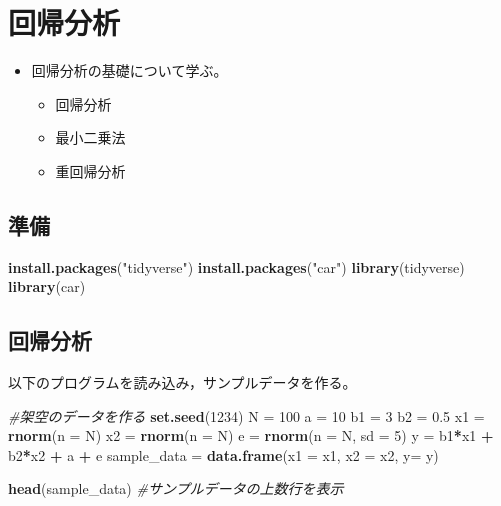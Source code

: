 \documentclass[]{article}
\newenvironment{Shaded}{\begin{snugshade}}{\end{snugshade}}
\newcommand{\KeywordTok}[1]{\textcolor[rgb]{0.13,0.29,0.53}{\textbf{#1}}}
\newcommand{\DataTypeTok}[1]{\textcolor[rgb]{0.13,0.29,0.53}{#1}}
\newcommand{\DecValTok}[1]{\textcolor[rgb]{0.00,0.00,0.81}{#1}}
\newcommand{\FloatTok}[1]{\textcolor[rgb]{0.00,0.00,0.81}{#1}}
\newcommand{\StringTok}[1]{\textcolor[rgb]{0.31,0.60,0.02}{#1}}
\newcommand{\CommentTok}[1]{\textcolor[rgb]{0.56,0.35,0.01}{\textit{#1}}}
\newcommand{\OperatorTok}[1]{\textcolor[rgb]{0.81,0.36,0.00}{\textbf{#1}}}
\newcommand{\NormalTok}[1]{#1}
\providecommand{\tightlist}{%
  \setlength{\itemsep}{0pt}\setlength{\parskip}{0pt}}
\begin{document}
\section{回帰分析}

\begin{itemize}
\tightlist
\item
  回帰分析の基礎について学ぶ。

  \begin{itemize}
  \tightlist
  \item
    回帰分析
  \item
    最小二乗法
  \item
    重回帰分析
  \end{itemize}
\end{itemize}

\subsection{準備}\label{-5}

\begin{Shaded}
\begin{Highlighting}[]
\KeywordTok{install.packages}\NormalTok{(}\StringTok{"tidyverse"}\NormalTok{)}
\KeywordTok{install.packages}\NormalTok{(}\StringTok{"car"}\NormalTok{)}
\KeywordTok{library}\NormalTok{(tidyverse)}
\KeywordTok{library}\NormalTok{(car)}
\end{Highlighting}
\end{Shaded}

\subsection{回帰分析}\label{-1}

以下のプログラムを読み込み，サンプルデータを作る。

\begin{Shaded}
\begin{Highlighting}[]
\CommentTok{#架空のデータを作る}
\KeywordTok{set.seed}\NormalTok{(}\DecValTok{1234}\NormalTok{)}
\NormalTok{N =}\StringTok{ }\DecValTok{100}
\NormalTok{a =}\StringTok{ }\DecValTok{10}
\NormalTok{b1 =}\StringTok{ }\DecValTok{3}
\NormalTok{b2 =}\StringTok{ }\FloatTok{0.5}
\NormalTok{x1 =}\StringTok{ }\KeywordTok{rnorm}\NormalTok{(}\DataTypeTok{n =}\NormalTok{ N)}
\NormalTok{x2 =}\StringTok{ }\KeywordTok{rnorm}\NormalTok{(}\DataTypeTok{n =}\NormalTok{ N)}
\NormalTok{e =}\StringTok{ }\KeywordTok{rnorm}\NormalTok{(}\DataTypeTok{n =}\NormalTok{ N, }\DataTypeTok{sd =} \DecValTok{5}\NormalTok{)}
\NormalTok{y =}\StringTok{ }\NormalTok{b1}\OperatorTok{*}\NormalTok{x1 }\OperatorTok{+}\StringTok{ }\NormalTok{b2}\OperatorTok{*}\NormalTok{x2 }\OperatorTok{+}\StringTok{ }\NormalTok{a }\OperatorTok{+}\StringTok{ }\NormalTok{e}
\NormalTok{sample_data =}\StringTok{ }\KeywordTok{data.frame}\NormalTok{(}\DataTypeTok{x1 =}\NormalTok{ x1, }\DataTypeTok{x2 =}\NormalTok{ x2, }\DataTypeTok{y=}\NormalTok{ y)}

\KeywordTok{head}\NormalTok{(sample_data) }\CommentTok{#サンプルデータの上数行を表示}
\end{Highlighting}
\end{Shaded}
\end{document}
